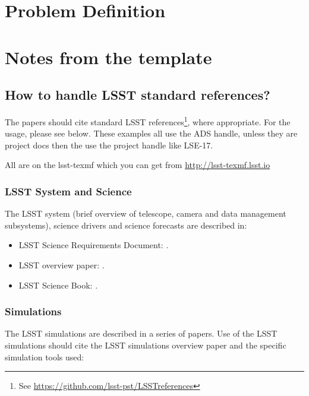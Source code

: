 \section{Problem Definition}

\section{Notes from the template}

\subsection{How to handle LSST standard references?} 

The papers should cite standard LSST references\footnote{See \url{https://github.com/lsst-pst/LSSTreferences}}, 
where appropriate. For the usage, please see below.  These examples all use the ADS handle, unless they are 
project docs then the use the project handle like LSE-17.

All are on the lsst-texmf which you can get from \url{http://lsst-texmf.lsst.io}


\subsubsection{LSST System and Science}

The LSST system (brief overview of telescope, camera and data management subsystems),
science drivers and science forecasts are described in:

\begin{itemize}
\item LSST Science Requirements Document: \cite{LPM-17}.
\item LSST overview paper: \cite{2008arXiv0805.2366I}.
\item LSST Science Book: \cite{abell2009lsst}.
\end{itemize}


\subsubsection{Simulations}

The LSST simulations are described in a series of papers. Use of the LSST simulations should cite the LSST simulations overview paper \cite{2014SPIE.9150E..14C} and the specific simulation tools used:

